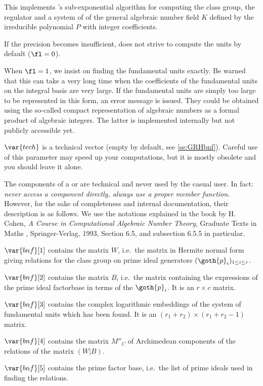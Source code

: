 This implements 's sub-exponential algorithm for computing the
class group, the regulator and a system of  of the
general algebraic number field $K$ defined by the irreducible polynomial $P$
with integer coefficients.

If the precision becomes insufficient,  does not strive to compute
the units by default ($\fl=0$).

When $\fl=1$, we insist on finding the fundamental units exactly. Be
warned that this can take a very long time when the coefficients of the
fundamental units on the integral basis are very large. If the fundamental
units are simply too large to be represented in this form, an error message
is issued. They could be obtained using the so-called compact representation
of algebraic numbers as a formal product of algebraic integers. The latter is
implemented internally but not publicly accessible yet.

$\var{tech}$ is a technical vector (empty by default, see \ref{se:GRHbnf}).
Careful use of this parameter may speed up your computations,
but it is mostly obsolete and you should leave it alone.

\smallskip

The components of a  or  are technical and never used by
the casual user. In fact: \emph{never access a component directly, always use
a proper member function.} However, for the sake of completeness and internal
documentation, their description is as follows. We use the notations
explained in the book by H. Cohen, \emph{A Course in Computational Algebraic
Number Theory}, Graduate Texts in Maths , Springer-Verlag, 1993,
Section 6.5, and subsection 6.5.5 in particular.

$\var{bnf}[1]$ contains the matrix $W$, i.e.~the matrix in Hermite normal
form giving relations for the class group on prime ideal generators
$(\goth{p}_i)_{1\le i\le r}$.

$\var{bnf}[2]$ contains the matrix $B$, i.e.~the matrix containing the
expressions of the prime ideal factorbase in terms of the $\goth{p}_i$.
It is an $r\times c$ matrix.

$\var{bnf}[3]$ contains the complex logarithmic embeddings of the system of
fundamental units which has been found. It is an $(r_1+r_2)\times(r_1+r_2-1)$
matrix.

$\var{bnf}[4]$ contains the matrix $M''_C$ of Archimedean components of the
relations of the matrix $(W|B)$.

$\var{bnf}[5]$ contains the prime factor base, i.e.~the list of prime
ideals used in finding the relations.

